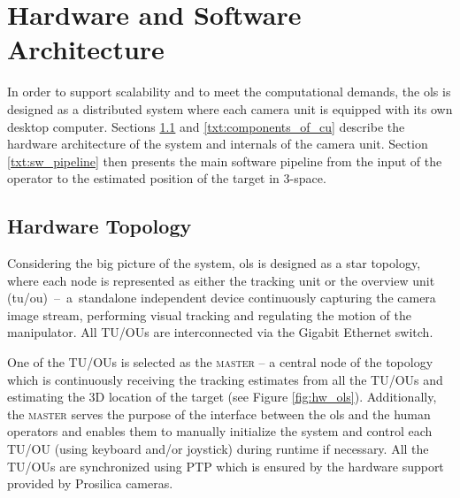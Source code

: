 \section{Hardware and Software Architecture} \label{txt:hw_and_sw_architecture}

In order to support scalability and to meet the computational demands, the \gls{ols} is designed as a distributed system where each camera unit is equipped with its own desktop computer. Sections \ref{txt:hardware_topology} and \ref{txt:components_of_cu} describe the hardware architecture of the system and internals of the camera unit. Section \ref{txt:sw_pipeline} then presents the main software pipeline from the input of the operator to the estimated position of the target in 3-space.

\subsection{Hardware Topology} \label{txt:hardware_topology}

Considering the big picture of the system, \gls{ols} is designed as a star topology, where each node is represented as either the tracking unit or the overview unit (\gls{tu/ou})~--~a~standalone independent device continuously capturing the camera image stream, performing visual tracking and regulating the motion of the manipulator. All TU/OUs are interconnected via the Gigabit Ethernet switch. 

One of the TU/OUs is selected as the \textsc{master} -- a central node of the topology which is continuously receiving the tracking estimates from all the TU/OUs and estimating the 3D location of the target (see Figure \ref{fig:hw_ols}). Additionally, the \textsc{master} serves the purpose of the interface between the \gls{ols} and the human operators and enables them to manually initialize the system and control each TU/OU (using keyboard and/or joystick) during runtime if necessary. All the TU/OUs are synchronized using PTP which is ensured by the hardware support provided by Prosilica cameras.


